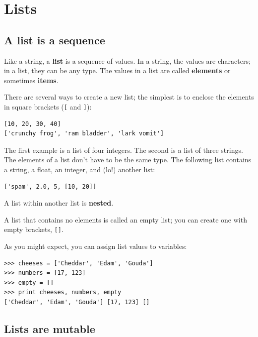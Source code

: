 \documentclass[10pt]{book}
\begin{document}
\chapter{Lists}

\section{A list is a sequence}
\label{sequence}

Like a string, a {\bf list} is a sequence of values.  In a string, the
values are characters; in a list, they can be any type.  The values in
a list are called {\bf elements} or sometimes {\bf items}.

There are several ways to create a new list; the simplest is to
enclose the elements in square brackets (\verb"[" and \verb"]"):

\begin{verbatim}
[10, 20, 30, 40]
['crunchy frog', 'ram bladder', 'lark vomit']
\end{verbatim}
%
The first example is a list of four integers.  The second is a list of
three strings.  The elements of a list don't have to be the same type.
The following list contains a string, a float, an integer, and
(lo!) another list:

\begin{verbatim}
['spam', 2.0, 5, [10, 20]]
\end{verbatim}
%
A list within another list is {\bf nested}.

A list that contains no elements is
called an empty list; you can create one with empty
brackets, \verb"[]".

As you might expect, you can assign list values to variables:

\begin{verbatim}
>>> cheeses = ['Cheddar', 'Edam', 'Gouda']
>>> numbers = [17, 123]
>>> empty = []
>>> print cheeses, numbers, empty
['Cheddar', 'Edam', 'Gouda'] [17, 123] []
\end{verbatim}
%


\section{Lists are mutable}
\label{mutable}
\end{document}
